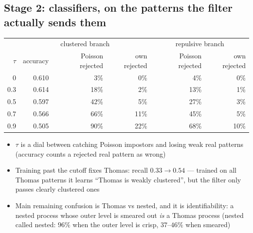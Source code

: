 \documentclass[11pt]{article}
\begin{document}
\subsection*{Stage 2: classifiers, on the patterns the filter actually sends them}
\begin{center}
\begin{tabular}{@{}rrrr|rr@{}}
\toprule
& \multicolumn{3}{c|}{clustered branch} & \multicolumn{2}{c}{repulsive branch} \\
$\tau$ & accuracy & Poisson rejected & own rejected & Poisson rejected & own rejected \\
\midrule
0   & 0.610 & 3\%  & 0\%  & 4\%  & 0\% \\
0.3 & 0.614 & 18\% & 2\%  & 13\% & 1\% \\
0.5 & 0.597 & 42\% & 5\%  & 27\% & 3\% \\
0.7 & 0.566 & 66\% & 11\% & 45\% & 5\% \\
0.9 & 0.505 & 90\% & 22\% & 68\% & 10\% \\
\bottomrule
\end{tabular}
\end{center}
\begin{itemize}
  \item $\tau$ is a dial between catching Poisson impostors and losing weak real patterns (accuracy counts a rejected real pattern as wrong)
  \item Training past the cutoff fixes Thomas: recall $0.33\to0.54$ --- trained on all Thomas patterns it learns ``Thomas is weakly clustered'', but the filter only passes clearly clustered ones
  \item Main remaining confusion is Thomas vs nested, and it is identifiability: a nested process whose outer level is smeared out \emph{is} a Thomas process (nested called nested: $96\%$ when the outer level is crisp, $37$--$46\%$ when smeared)
\end{itemize}
\end{document}
